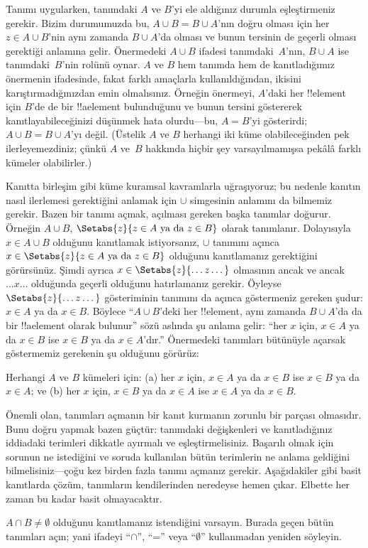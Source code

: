 \documentclass[../../../include/open-logic-section]{subfiles}
\begin{document}
Tanımı uygularken, tanımdaki $A$ ve $B$'yi ele aldığınız durumla
eşleştirmeniz gerekir. Bizim durumumuzda bu, $A \cup B = B \cup A$'nın
doğru olması için her $z \in A \cup B$'nin aynı zamanda $B \cup A$'da
olması ve bunun tersinin de geçerli olması gerektiği anlamına gelir.
Önermedeki $A \cup B$ ifadesi tanımdaki~$A$'nın, $B \cup A$ ise
tanımdaki~$B$'nin rolünü oynar. $A$ ve $B$ hem tanımda hem de
kanıtladığımız önermenin ifadesinde, fakat farklı amaçlarla
kullanıldığından, ikisini karıştırmadığınızdan emin olmalısınız.
Örneğin önermeyi, $A$'daki her !!{element} için $B$'de de bir
!!a{element} bulunduğunu ve bunun tersini göstererek kanıtlayabileceğinizi
düşünmek hata olurdu---bu, $A = B$'yi gösterirdi; $A \cup B = B \cup A$'yı
değil. (Üstelik $A$ ve $B$ herhangi iki küme olabileceğinden pek
ilerleyemezdiniz; çünkü $A$ ve~$B$ hakkında hiçbir şey varsayılmamışsa
pekâlâ farklı kümeler olabilirler.)

Kanıtta birleşim gibi küme kuramsal kavramlarla uğraşıyoruz; bu nedenle
kanıtın nasıl ilerlemesi gerektiğini anlamak için $\cup$ simgesinin
anlamını da bilmemiz gerekir. Bazen bir tanımı açmak, açılması gereken
başka tanımlar doğurur. Örneğin $A \cup B$, $\Setabs{z}{z \in A
  \text{ ya da } z \in B}$ olarak tanımlanır. Dolayısıyla $x \in A \cup
B$ olduğunu kanıtlamak istiyorsanız, $\cup$ tanımını açınca $x \in
\Setabs{z}{z \in A \text{ ya da } z \in B}$ olduğunu kanıtlamanız
gerektiğini görürsünüz. Şimdi ayrıca $x \in
\Setabs{z}{\dots z\dots}$ olmasının ancak ve ancak $\dots x\dots$
olduğunda geçerli olduğunu hatırlamanız gerekir. Öyleyse
$\Setabs{z}{\dots z \dots}$ gösteriminin tanımını da açınca göstermeniz
gereken şudur: $x \in A$ ya da $x \in B$. Böylece ``$A \cup B$'deki her
!!{element}, aynı zamanda $B \cup A$'da da bir !!a{element} olarak bulunur'' sözü
aslında şu anlama gelir: ``her $x$ için, $x \in A$ ya da $x \in B$ ise
$x \in B$ ya da $x \in A$'dır.'' Önermedeki tanımları bütünüyle
açarsak göstermemiz gerekenin şu olduğunu görürüz:

\begin{prop}
Herhangi $A$ ve $B$ kümeleri için: (a) her $x$ için, $x \in A$ ya da
$x \in B$ ise $x \in B$ ya da $x \in A$; ve (b) her $x$ için, $x \in
B$ ya da $x \in A$ ise $x \in A$ ya da $x \in B$.
\end{prop}

Önemli olan, tanımları açmanın bir kanıt kurmanın zorunlu bir parçası
olmasıdır. Bunu doğru yapmak bazen güçtür: tanımdaki değişkenleri ve
kanıtladığınız iddiadaki terimleri dikkatle ayırmalı ve eşleştirmelisiniz.
Başarılı olmak için sorunun ne istediğini ve soruda kullanılan bütün
terimlerin ne anlama geldiğini bilmelisiniz---çoğu kez birden fazla
tanımı açmanız gerekir. Aşağıdakiler gibi basit kanıtlarda çözüm,
tanımların kendilerinden neredeyse hemen çıkar. Elbette her zaman bu
kadar basit olmayacaktır.

\begin{prob}
$A \cap B \neq \emptyset$ olduğunu kanıtlamanız istendiğini varsayın.
Burada geçen bütün tanımları açın; yani ifadeyi ``$\cap$'', ``='' veya
``$\emptyset$'' kullanmadan yeniden söyleyin.
\end{prob}
\end{document}
